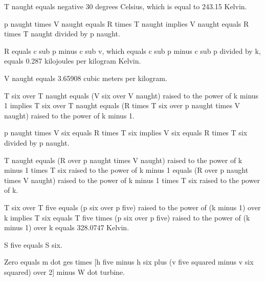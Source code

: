 T naught equals negative 30 degrees Celsius, which is equal to 243.15 Kelvin.

p naught times V naught equals R times T naught implies V naught equals R times T naught divided by p naught.

R equals c sub p minus c sub v, which equals c sub p minus c sub p divided by k, equals 0.287 kilojoules per kilogram Kelvin.

V naught equals 3.65908 cubic meters per kilogram.

T six over T naught equals (V six over V naught) raised to the power of k minus 1 implies T six over T naught equals (R times T six over p naught times V naught) raised to the power of k minus 1.

p naught times V six equals R times T six implies V six equals R times T six divided by p naught.

T naught equals (R over p naught times V naught) raised to the power of k minus 1 times T six raised to the power of k minus 1 equals (R over p naught times V naught) raised to the power of k minus 1 times T six raised to the power of k.

T six over T five equals (p six over p five) raised to the power of (k minus 1) over k implies T six equals T five times (p six over p five) raised to the power of (k minus 1) over k equals 328.0747 Kelvin.

S five equals S six.

Zero equals m dot ges times [h five minus h six plus (v five squared minus v six squared) over 2] minus W dot turbine.